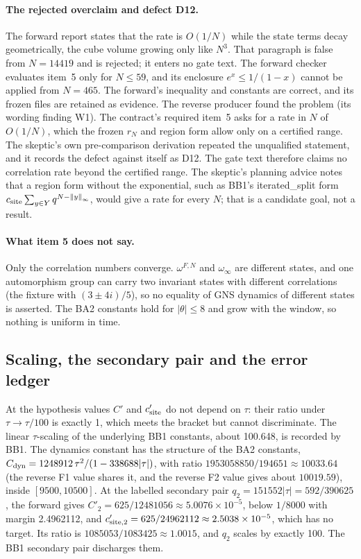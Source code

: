 \paragraph{The rejected overclaim and defect D12.} The forward report states
that the rate is $O(1/N)$ while the state terms decay geometrically, the cube
volume growing only like $N^3$. That paragraph is false from $N=14419$ and is
rejected; it enters no gate text. The forward checker evaluates item~5 only
for $N\le59$, and its enclosure $e^x\le1/(1-x)$ cannot be applied from
$N=465$. The forward's inequality and constants are correct, and its frozen
files are retained as evidence. The reverse producer found the problem (its
wording finding W1). The contract's required item~5 asks for a rate in $N$ of
$O(1/N)$, which the frozen $r_N$ and region form allow only on a certified
range. The skeptic's own pre-comparison derivation repeated the unqualified
statement, and it records the defect against itself as D12. The gate text
therefore claims no correlation rate beyond the certified range. The
skeptic's planning advice notes that a region form without the exponential,
such as BB1's iterated\_split form $c_{\rm site}\sum_{y\in Y}q^{N-\left\lVert y\right\rVert_\infty}$, would give a rate for every $N$; that is a candidate goal, not a
result.

\paragraph{What item 5 does not say.} Only the correlation numbers converge.
$\omega^{F,N}$ and $\omega_\infty$ are different states, and one automorphism
group can carry two invariant states with different correlations (the fixture
with $(3\pm4i)/5$), so no equality of GNS dynamics of different states is
asserted. The BA2 constants hold for $|\theta|\le8$ and grow with the window,
so nothing is uniform in time.

\subsection{Scaling, the secondary pair and the error ledger}
\label{sec:bb2-ledger}
At the hypothesis values $C'$ and $c'_{\rm site}$ do not depend on $\tau$:
their ratio under $\tau\to\tau/100$ is exactly 1, which meets the bracket but
cannot discriminate. The linear $\tau$-scaling of the underlying BB1 constants,
about 100.648, is recorded by BB1. The dynamics constant has the structure of
the BA2 constants, $C_{\rm dyn}=1248912\,\tau^2/(1-338688|\tau|)$, with ratio
$1953058850/194651\approx10033.64$ (the reverse F1 value shares it, and the
reverse F2 value gives about $10019.59$), inside $[9500,10500]$. At the
labelled secondary pair $q_2=151552|\tau|=592/390625$, the forward gives
$C'_2=625/12481056\approx5.0076\times10^{-5}$, below $1/8000$ with margin
2.4962112, and $c'_{{\rm site},2}=625/24962112\approx2.5038\times10^{-5}$,
which has no target. Its ratio is $1085053/1083425\approx1.0015$, and $q_2$
scales by exactly 100. The BB1 secondary pair discharges them.

